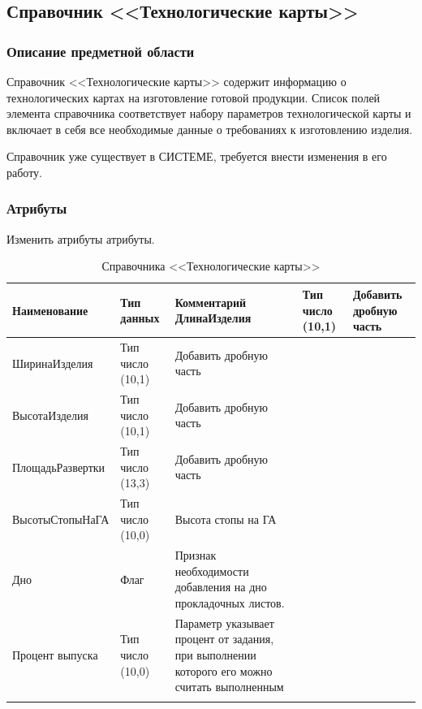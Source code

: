 \subsection{Справочник <<Технологические карты>>}
\label{spr:Design}


\subsubsection{Описание предметной области}

Справочник <<Технологические карты>> содержит информацию о технологических картах на изготовление готовой продукции. Список полей элемента справочника соответствует набору параметров технологической карты и включает в себя все необходимые данные о требованиях к изготовлению изделия. 
	
Справочник уже существует в СИСТЕМЕ, требуется внести изменения в его работу.

 \subsubsection{Атрибуты}

Изменить атрибуты атрибуты.
\pc
\begin{longtable}{|p{4cm}|p{4cm}|p{8cm}|}
\hline
{\bf Наименование} & {\bf Тип данных} &  {\bf Комментарий} \endhead
    \hline
    ДлинаИзделия & Тип число (10,1)  & Добавить дробную часть\\
    \hline
    ШиринаИзделия & Тип число (10,1)  & Добавить дробную часть\\
    \hline
    ВысотаИзделия & Тип число (10,1)  & Добавить дробную часть\\
    \hline
    ПлощадьРазвертки & Тип число (13,3)  & Добавить дробную часть\\
    \hline
    ВысотыСтопыНаГА & Тип число (10,0)  & Высота стопы на ГА\\
    \hline    
    Дно & Флаг  & Признак необходимости добавления на дно прокладочных листов.\\
    \hline
    Процент выпуска  & Тип число (10,0)  & Параметр указывает процент от задания, при выполнении которого его можно считать выполненным \\
    \hline    
  \caption{Справочника <<Технологические карты>>}
 \label{tab:Design2}
\end{longtable}
%


